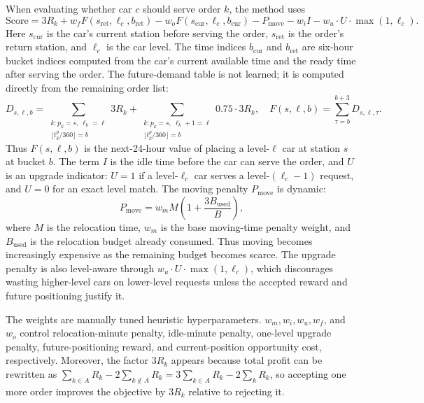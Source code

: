 \documentclass[10pt,a4paper]{article}
\begin{document}
When evaluating whether car $c$ should serve order $k$, the method uses
\[
\text{Score}
=3R_k
+ w_f F(s_{\text{ret}}, \ell_c, b_{\text{ret}})
- w_o F(s_{\text{cur}}, \ell_c, b_{\text{cur}})
- P_{\text{move}}
- w_i I
- w_u \cdot U \cdot \max(1,\ell_c).
\]
Here $s_{\text{cur}}$ is the car's current station before serving the order,
$s_{\text{ret}}$ is the order's return station, and $\ell_c$ is the car level.
The time indices $b_{\text{cur}}$ and $b_{\text{ret}}$ are six-hour bucket
indices computed from the car's current available time and the ready time after
serving the order.  The future-demand table is not learned; it is computed
directly from the remaining order list:
\[
D_{s,\ell,b}=\sum_{\substack{k:p_k=s,\ \ell_k=\ell\\
\lfloor t^p_k/360\rfloor=b}}3R_k
+\sum_{\substack{k:p_k=s,\ \ell_k+1=\ell\\
\lfloor t^p_k/360\rfloor=b}}0.75\cdot 3R_k,
\quad
F(s,\ell,b)=\sum_{\tau=b}^{b+3}D_{s,\ell,\tau}.
\]
Thus $F(s,\ell,b)$ is the next-24-hour value of placing a level-$\ell$ car at
station $s$ at bucket $b$.  The term $I$ is the idle time before the car can
serve the order, and $U$ is an upgrade indicator: $U=1$ if a level-$\ell_c$ car
serves a level-$(\ell_c-1)$ request, and $U=0$ for an exact level match.
The moving penalty $P_{\text{move}}$ is dynamic:
\[
P_{\text{move}}=w_m M\left(1+\frac{3B_{\text{used}}}{B}\right),
\]
where $M$ is the relocation time, $w_m$ is the base moving-time penalty weight,
and $B_{\text{used}}$ is the relocation budget already consumed.  Thus moving
becomes increasingly expensive as the remaining budget becomes scarce.  The
upgrade penalty is also level-aware through
$w_u\cdot U\cdot\max(1,\ell_c)$, which discourages wasting higher-level cars on
lower-level requests unless the accepted reward and future positioning justify
it.

The weights are manually tuned heuristic hyperparameters.  $w_m,w_i,w_u,w_f$,
and $w_o$ control relocation-minute penalty, idle-minute penalty, one-level
upgrade penalty, future-positioning reward, and current-position opportunity
cost, respectively.
Moreover, the factor $3R_k$ appears because total profit can be rewritten as
$\sum_{k\in A} R_k-2\sum_{k\notin A}R_k = 3\sum_{k\in A}R_k-2\sum_k R_k$,
so accepting one more order improves the objective by $3R_k$ relative to
rejecting it.
\end{document}
